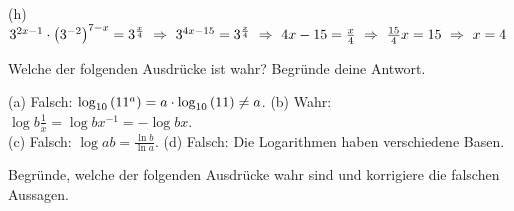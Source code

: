 \documentclass[11pt]{exam}
\begin{document}
\begin{questions}
{\begin{solution}
		(h) $3^{2x-1}\*\left(3^{-2}\right)^{7-x}=3^{\frac{x}{4}}\ \Rightarrow\ 3^{4x-15}=3^{\frac{x}{4}}\ \Rightarrow\ 4x-15=\frac{x}{4}\ \Rightarrow\ \frac{15}{4}x=15\ \Rightarrow\ x=4$
\end{solution}}
{}


\question[4]
Welche der folgenden Ausdrücke ist wahr? Begründe deine Antwort.
{\begin{solution}
		(a) Falsch: $\log{10}{11^a}=a\*\log{10}{11}\neq a$. \quad (b) Wahr: $\log{b}{\frac{1}{x}}=\log{b}{x^{-1}}=-\log{b}{x}$.\\
		(c) Falsch: $\log{a}{b}=\frac{\ln{b}}{\ln{a}}$. \quad (d) Falsch: Die Logarithmen haben verschiedene Basen.
\end{solution}}
{}

\question[4]
Begründe, welche der folgenden Ausdrücke wahr sind und korrigiere die falschen Aussagen.
\begin{parcols}[2]

\end{parcols}
\end{questions}
\end{document}
